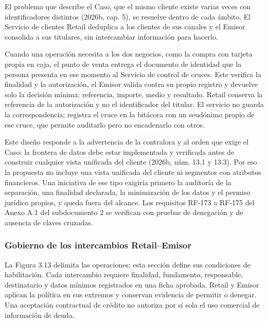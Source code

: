 \documentclass[11pt]{article}
\begin{document}
{El problema que describe el Caso, que el mismo cliente existe varias veces con identificadores distintos (2026b, cap. 5), se resuelve dentro de cada ámbito. El Servicio de clientes Retail deduplica a los clientes de sus canales y el Emisor consolida a sus titulares, sin intercambiar información para hacerlo.}

{Cuando una operación necesita a los dos negocios, como la compra con tarjeta propia en caja, el punto de venta entrega el documento de identidad que la persona presenta en ese momento al Servicio de control de cruces. Este verifica la finalidad y la autorización, el Emisor valida contra su propio registro y devuelve solo la decisión mínima: referencia, importe, medio y resultado. Retail conserva la referencia de la autorización y no el identificador del titular. El servicio no guarda la correspondencia; registra el cruce en la bitácora con un seudónimo propio de ese cruce, que permite auditarlo pero no encadenarlo con otros.}

{Este diseño responde a la advertencia de la contralora y al orden que exige el Caso: la frontera de datos debe estar implementada y verificada antes de construir cualquier vista unificada del cliente (2026b, núm. 13.1 y 13.3). Por eso la propuesta no incluye una vista unificada del cliente ni segmentos con atributos financieros. Una iniciativa de ese tipo exigiría primero la auditoría de la separación, una finalidad declarada, la minimización de los datos y el permiso jurídico propios, y queda fuera del alcance. Los requisitos RF-173 a RF-175 del Anexo A.1 del subdocumento 2 se verifican con pruebas de denegación y de ausencia de claves cruzadas.}

\subsubsection{Gobierno de los intercambios Retail--Emisor}

{La Figura 3.13 delimita las operaciones; esta sección define sus condiciones de habilitación. Cada intercambio requiere finalidad, fundamento, responsable, destinatario y datos mínimos registrados en una ficha aprobada. Retail y Emisor aplican la política en sus extremos y conservan evidencia de permitir o denegar. Una aceptación contractual de crédito no autoriza por sí sola el uso comercial de información de deuda.}
\end{document}
